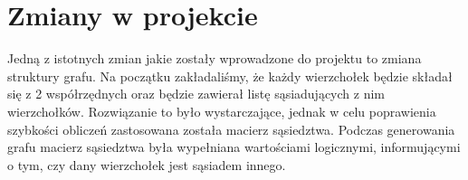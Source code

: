 
\section{Zmiany w projekcie}
	\label{final:zmiany}

	Jedną z istotnych zmian jakie zostały wprowadzone do projektu to zmiana struktury grafu. Na początku zakładaliśmy, że każdy wierzchołek będzie składał się z 2 współrzędnych oraz będzie zawierał listę sąsiadujących z nim wierzchołków. Rozwiązanie to było wystarczające, jednak w celu poprawienia szybkości obliczeń zastosowana została macierz sąsiedztwa. Podczas generowania grafu macierz sąsiedztwa była wypełniana wartościami logicznymi, informującymi o tym, czy dany wierzchołek jest sąsiadem innego.

